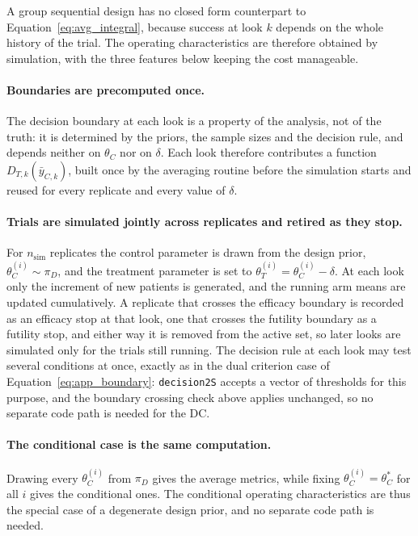 A group sequential design has no closed form counterpart to Equation~\eqref{eq:avg_integral}, because success
at look $k$ depends on the whole history of the trial. The operating characteristics are therefore obtained by
simulation, with the three features below keeping the cost manageable.

\paragraph{Boundaries are precomputed once.} The decision boundary at each look is a property of the analysis,
not of the truth: it is determined by the priors, the sample sizes and the decision rule, and depends neither on
$\theta_C$ nor on $\delta$. Each look therefore contributes a function $D_{T,k}(\bar{y}_{C,k})$, built once by the averaging routine
before the simulation starts and reused for every replicate and every value of $\delta$.

\paragraph{Trials are simulated jointly across replicates and retired as they stop.} For $n_{\text{sim}}$ replicates the
control parameter is drawn from the design prior, $\theta_C^{(i)} \sim \pi_D$, and the treatment parameter is
set to $\theta_T^{(i)} = \theta_C^{(i)} - \delta$. At each look only the increment of new patients is
generated, and the running arm means are updated cumulatively. A replicate that crosses the efficacy boundary is
recorded as an efficacy stop at that look, one that crosses the futility boundary as a futility stop, and either
way it is removed from the active set, so later looks are simulated only for the trials still running. The
decision rule at each look may test several conditions at once, exactly as in the dual criterion case of
Equation~\eqref{eq:app_boundary}: \texttt{decision2S} accepts a vector of thresholds for this purpose, and the
boundary crossing check above applies unchanged, so no separate code path is needed for the DC.

\paragraph{The conditional case is the same computation.} Drawing every $\theta_C^{(i)}$ from $\pi_D$ gives
the average metrics, while fixing $\theta_C^{(i)} = \theta_C^*$ for all $i$ gives the conditional ones. The
conditional operating characteristics are thus the special case of a degenerate design prior, and no separate
code path is needed.

